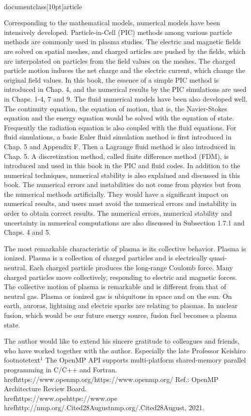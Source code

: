 \\documentclass[10pt]{article}
\begin{document}
Corresponding to the mathematical models, numerical models have been intensively developed. Particle-in-Cell (PIC) methods among various particle methods are commonly used in plasma studies. The electric and magnetic fields are solved on spatial meshes, and charged articles are pushed by the fields, which are interpolated on particles from the field values on the meshes. The charged particle motion induces the net charge and the electric current, which change the original field values. In this book, the essence of a simple PIC method is introduced in Chap. 4, and the numerical results by the PIC simulations are used in Chaps. 1-4, 7 and 9. The fluid numerical models have been also developed well. The continuity equation, the equation of motion, that is, the Navier-Stokes equation and the energy equation would be solved with the equation of state. Frequently the radiation equation is also coupled with the fluid equations. For fluid simulations, a basic Euler fluid simulation method is first introduced in Chap. 5 and Appendix F. Then a Lagrange fluid method is also introduced in Chap. 5. A discretization method, called finite difference method (FDM), is introduced and used in this book in the PIC and fluid codes. In addition to the numerical techniques, numerical stability is also explained and discussed in this book. The numerical errors and instabilities do not come from physics but from the numerical methods artificially. They would have a significant impact on numerical results, and users must avoid the numerical errors and instability in order to obtain correct results. The numerical errors, numerical stability and uncertainty in numerical computations are also discussed in Subsection 1.7.1 and Chaps. 4 and 5.

The most remarkable characteristic of plasma is its collective behavior. Plasma is ionized. Plasma is a collection of charged particles and is electrically quasi-neutral. Each charged particle produces the long-range Coulomb force. Many charged particles move collectively, responding to electric and magnetic forces. The collective motion of plasma is remarkable and is different from that of neutral gas. Plasma or ionized gas is ubiquitous in space and on the sun. On earth, auroras, lightning and electric sparks are relating to plasmas. In nuclear fusion, which would be our future energy source, fusion fuel becomes a plasma state.

The author would like to extend his sincere gratitude to colleagues and friends, who have worked together with the author. Especially the late Professor Keishiro
\\footnotetext{${ }^{1}$ The OpenMP API supports multi-platform shared-memory parallel programming in C/C++ and Fortran. \\href{https://www.openmp.org/}{https://www.openmp.org/} Ref.: OpenMP Architecture Review Board. \\href{https://www.ope}{https://www.ope} \\href{http://nmp.org/.Cited28August}{nmp.org/.Cited28August}, 2021.
}
\end{document}
